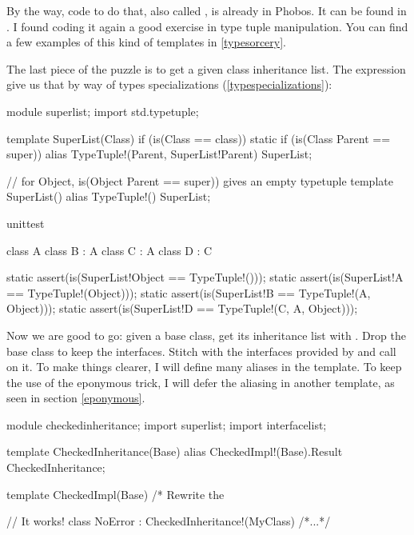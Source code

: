 By the way, code to do that, also called , is already in Phobos. It can be found in . I found coding it again a good exercise in type tuple manipulation. You can find a few examples of this kind of templates in \autoref{typesorcery}.

The last piece of the puzzle is to get a given class inheritance list. The  expression give us that by way of types specializations (\ref{typespecializations}):

\begin{dcode}
module superlist;
import std.typetuple;

template SuperList(Class) if (is(Class == class))
{
    static if (is(Class Parent == super))
        alias TypeTuple!(Parent, SuperList!Parent) SuperList;
}

// for Object, is(Object Parent == super)) gives an empty typetuple
template SuperList()
{
    alias TypeTuple!() SuperList;
}

unittest
{
    class A {}
    class B : A {}
    class C : A {}
    class D : C {}
    
    static assert(is(SuperList!Object == TypeTuple!()));
    static assert(is(SuperList!A      == TypeTuple!(Object)));
    static assert(is(SuperList!B      == TypeTuple!(A, Object)));
    static assert(is(SuperList!D      == TypeTuple!(C, A, Object)));   
}
\end{dcode}


Now we are good to go: given a base class, get its inheritance list with . Drop the base class to keep the interfaces. Stitch with the interfaces provided by  and call  on it. To make things clearer, I will define many aliases in the template. To keep the use of the eponymous trick, I will defer the aliasing in another template, as seen in section \ref{eponymous}.

\begin{dcode}
module checkedinheritance;
import superlist;
import interfacelist;

template CheckedInheritance(Base)
{
    alias CheckedImpl!(Base).Result CheckedInheritance;
}

template CheckedImpl(Base)
{
    /* Rewrite the 
} 

// It works!
class NoError : CheckedInheritance!(MyClass) { /*...*/ }
\end{dcode}


